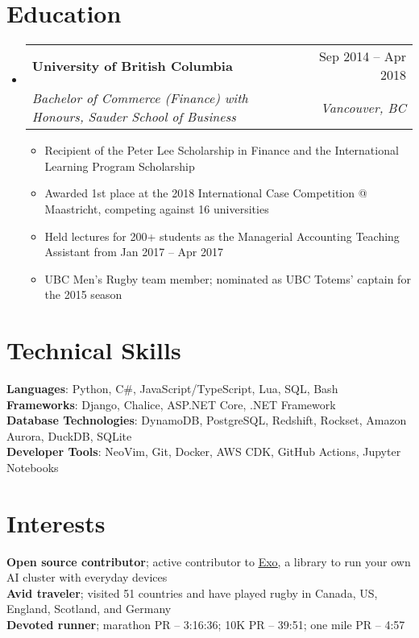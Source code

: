 \documentclass[letterpaper,11pt]{article}
\makeatletter
\newcommand{\resumeItem}[1]{
  \item\small{
    {#1 \vspace{-2pt}}
  }
}
\newcommand{\resumeSubheading}[4]{
  \vspace{-2pt}\item
    \begin{tabular*}{0.97\textwidth}[t]{l@{\extracolsep{\fill}}r}
      \textbf{#1} & #2 \\
      \textit{\small#3} & \textit{\small #4} \\
    \end{tabular*}\vspace{-7pt}
}
\newcommand{\resumeSubHeadingListStart}{\begin{itemize}[leftmargin=0.15in, label={}]}
\newcommand{\resumeSubHeadingListEnd}{\end{itemize}}
\newcommand{\resumeItemListStart}{\begin{itemize}}
\newcommand{\resumeItemListEnd}{\end{itemize}\vspace{-5pt}}
\makeatother
\begin{document}
\section{Education}
  \resumeSubHeadingListStart
    \resumeSubheading
      {University of British Columbia}{Sep 2014 -- Apr 2018}
      {Bachelor of Commerce (Finance) with Honours, Sauder School of Business}{Vancouver, BC}
      \resumeItemListStart
        \resumeItem{Recipient of the Peter Lee Scholarship in Finance and the International Learning Program Scholarship}
        \resumeItem{Awarded 1st place at the 2018 International Case Competition @ Maastricht, competing against 16 universities}
        \resumeItem{Held lectures for 200+ students as the Managerial Accounting Teaching Assistant from Jan 2017 -- Apr 2017}
        \resumeItem{UBC Men's Rugby team member; nominated as UBC Totems' captain for the 2015 season}
      \resumeItemListEnd
  \resumeSubHeadingListEnd

\section{Technical Skills}
 \begin{itemize}[leftmargin=0.15in, label={}]
    \small{\item{
     \textbf{Languages}{: Python, C\#, JavaScript/TypeScript, Lua, SQL, Bash}\\
     \textbf{Frameworks}{: Django, Chalice, ASP.NET Core, .NET Framework}\\
     \textbf{Database Technologies}{: DynamoDB, PostgreSQL, Redshift, Rockset, Amazon Aurora, DuckDB, SQLite}\\
     \textbf{Developer Tools}{: NeoVim, Git, Docker, AWS CDK, GitHub Actions, Jupyter Notebooks}
    }}
 \end{itemize}

\section{Interests}
 \begin{itemize}[leftmargin=0.15in, label={}]
    \small{\item{
      \textbf{Open source contributor}{; active contributor to }\href{https://github.com/exo-explore/exo}{\underline{Exo}}{, a library to run your own AI cluster with everyday devices}\\
     \textbf{Avid traveler}{; visited 51 countries and have played rugby in Canada, US, England, Scotland, and Germany}\\
     \textbf{Devoted runner}{; marathon PR – 3:16:36; 10K PR – 39:51; one mile PR – 4:57}
    }}
 \end{itemize}
\end{document}
